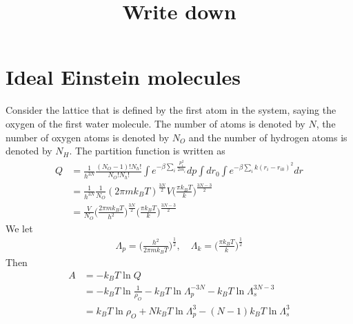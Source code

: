 \documentclass[aps,pre,a4paper,showkeys,fleqn]{revtex4}
\begin{document}
\title{
Write down
}

\maketitle

\section{Ideal Einstein molecules}
Consider the lattice that is defined by the first atom in the system, saying the oxygen of the first water molecule.
The number of atoms is denoted by $N$, the number of oxygen atoms is denoted by $N_O$ and the number of hydrogen atoms is denoted by $N_H$.
The partition function is written as
\begin{align*}
  Q & = \frac{1}{h^{3N}}
      \frac{(N_O-1)!N_h!}{N_O!N_h!}
      \int e^{-\beta\sum_i\frac{p_i^2}{2m_i}} dp
      \int dr_0\int e^{-\beta\sum_i k(r_i - r_{i0})^2} dr \\
    &=
      \frac{1}{h^{3N}}\frac{1}{N_O}
      (2\pi m k_BT)^{\frac{3N}{2}}
      {V}
      \Big(\frac{\pi k_BT}{k}\Big)^{\frac{3N-3}2} \\
    &=
      \frac{V}{N_O}
      \Big( \frac{2\pi m k_BT}{h^2} \Big)^{\frac{3N}{2}}
      \Big( \frac{\pi k_BT}{k} \Big)^{\frac{3N-3}{2}}
\end{align*}
We let
\begin{align*}
  \Lambda_p = \Big(\frac{h^2}{2\pi m k_BT}\Big)^{\frac12}, \quad \Lambda_k = \Big(\frac{\pi k_BT}{k}\Big)^{\frac12}
\end{align*}
Then
\begin{align*}
  A
  &=
    -k_BT \ln Q \\
  &=
    -k_BT \ln \frac1{\rho_O} - k_BT \ln \Lambda_p^{-3N} - k_BT \ln \Lambda_s^{3N-3} \\
  &=
    k_BT \ln {\rho_O} + Nk_BT \ln \Lambda_p^3 - (N-1) k_BT \ln \Lambda_s^3
\end{align*}
\end{document}
